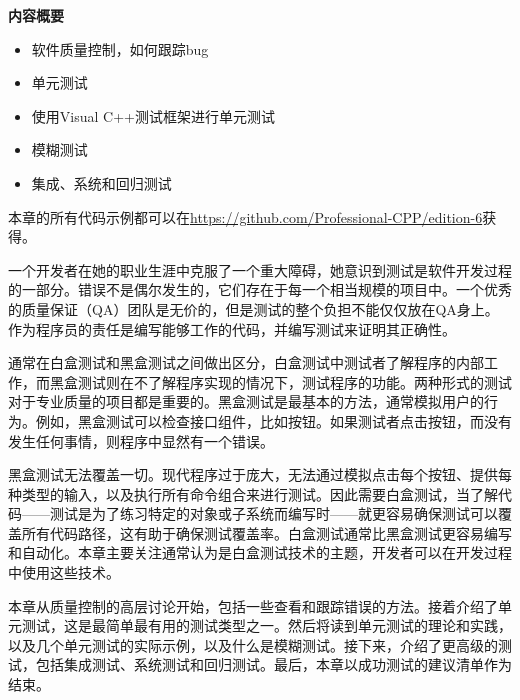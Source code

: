 \noindent
\textbf{内容概要}

\begin{itemize}
\item
软件质量控制，如何跟踪bug

\item
单元测试

\item
使用Visual C++测试框架进行单元测试

\item
模糊测试

\item
集成、系统和回归测试
\end{itemize}

本章的所有代码示例都可以在\url{https://github.com/Professional-CPP/edition-6}获得。

一个开发者在她的职业生涯中克服了一个重大障碍，她意识到测试是软件开发过程的一部分。错误不是偶尔发生的，它们存在于每一个相当规模的项目中。一个优秀的质量保证（QA）团队是无价的，但是测试的整个负担不能仅仅放在QA身上。作为程序员的责任是编写能够工作的代码，并编写测试来证明其正确性。

通常在白盒测试和黑盒测试之间做出区分，白盒测试中测试者了解程序的内部工作，而黑盒测试则在不了解程序实现的情况下，测试程序的功能。两种形式的测试对于专业质量的项目都是重要的。黑盒测试是最基本的方法，通常模拟用户的行为。例如，黑盒测试可以检查接口组件，比如按钮。如果测试者点击按钮，而没有发生任何事情，则程序中显然有一个错误。

黑盒测试无法覆盖一切。现代程序过于庞大，无法通过模拟点击每个按钮、提供每种类型的输入，以及执行所有命令组合来进行测试。因此需要白盒测试，当了解代码——测试是为了练习特定的对象或子系统而编写时——就更容易确保测试可以覆盖所有代码路径，这有助于确保测试覆盖率。白盒测试通常比黑盒测试更容易编写和自动化。本章主要关注通常认为是白盒测试技术的主题，开发者可以在开发过程中使用这些技术。

本章从质量控制的高层讨论开始，包括一些查看和跟踪错误的方法。接着介绍了单元测试，这是最简单最有用的测试类型之一。然后将读到单元测试的理论和实践，以及几个单元测试的实际示例，以及什么是模糊测试。接下来，介绍了更高级的测试，包括集成测试、系统测试和回归测试。最后，本章以成功测试的建议清单作为结束。
